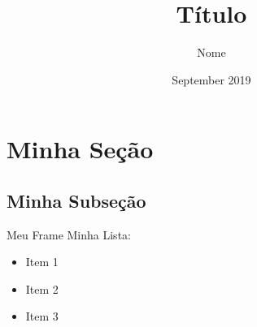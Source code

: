 \documentclass{beamer}
\title{Título}
\author{Nome}
\date{September 2019}
\begin{document}
\maketitle

\section{Minha Seção}

\subsection{Minha Subseção}

\begin{frame}{Meu Frame}
Minha Lista:
\begin{itemize}
    \pause
    \item Item 1
    \pause
    \item Item 2
    \pause
    \item Item 3
\end{itemize}
\end{frame}
\end{document}
